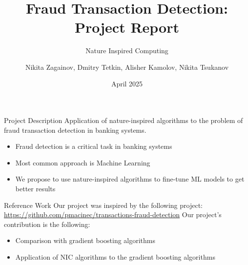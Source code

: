 \documentclass[aspectratio=169,xcolor=dvipsnames]{beamer}
\title{Fraud Transaction Detection: Project Report}
\subtitle{Nature Inspired Computing}
\author{Nikita Zagainov, Dmitry Tetkin, Alisher Kamolov, Nikita Tsukanov}
\institute
{
    Innopolis University
}
\date{April 2025} %
\begin{document}
\begin{frame}
	\titlepage
\end{frame}


\begin{frame}{Project Description}
	Application of nature-inspired algorithms
	to the problem of fraud transaction detection
	in banking systems.
	\begin{itemize}
		\item Fraud detection is a critical task in banking systems
		\item Most common approach is Machine Learning
		\item We propose to use nature-inspired algorithms to fine-tune
		      ML models to get better results
	\end{itemize}
\end{frame}


\begin{frame}{Reference Work}
	Our project was inspired by the following project:
	\url{https://github.com/pmacinec/transactions-fraud-detection}
	Our project's contribution is the following:
	\begin{itemize}
		\item Comparison with gradient boosting algorithms
		\item Application of NIC algorithms to the gradient boosting
		      algorithms
	\end{itemize}

\end{frame}
\end{document}
